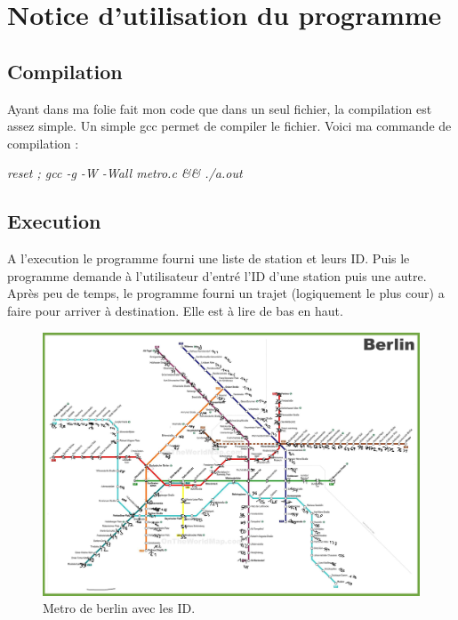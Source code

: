 \section{Notice d'utilisation du programme}
\subsection{Compilation}

Ayant dans ma folie fait mon code que dans un seul fichier, la compilation est assez simple. Un simple gcc permet de compiler le fichier. Voici ma commande de compilation :
 \smallbreak

\textit{reset ; gcc -g -W -Wall metro.c && ./a.out}

\subsection{Execution}

A l'execution le programme fourni une liste de station et leurs ID. Puis le programme demande à l'utilisateur d'entré l'ID d'une station puis une autre.
Après peu de temps, le programme fourni un trajet (logiquement le plus cour) a faire pour arriver à destination. Elle est à lire de bas en haut.

\begin{figure}[h]
\centerline{\includegraphics[width=1\textwidth]{images/metroID.jpg}}
\caption{\label{legende} Metro de berlin avec les ID.
}
\end{figure}

